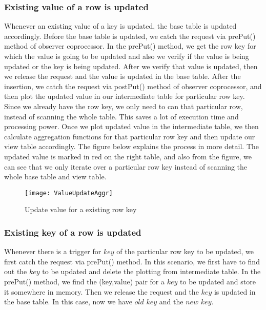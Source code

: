 \documentclass[11pt,a4paper,bibtotoc,idxtotoc,headsepline,footsepline,footexclude,BCOR12mm,DIV13]{scrbook}
\begin{document}
\subsubsection{Existing value of a row is updated}
Whenever an existing value of a key is updated, the base table is updated accordingly. Before the base table is updated, we catch the request via prePut() method of observer coprocessor. In the prePut() method, we get the row key for which the value is going to be updated and also we verify if the value is being updated or the key is being updated. After we verify that value is updated, then we release the request and the value is updated in the base table. After the insertion, we catch the request via postPut() method of observer coprocessor, and then plot the updated value in our intermediate table for particular row key. Since we already have  the row key, we only need to can that particular row, instead of scanning the whole table. This saves a lot of execution time and processing power. Once we plot updated value in the intermediate table, we then calculate aggregation functions for that particular row key and then update our view table accordingly.
The figure below explains the process in more detail. The updated value is marked in red on the right table, and also from the figure, we can see that we only iterate over a particular row key instead of scanning the whole base table and view table.

\begin{figure}
    \centering
    \texttt{[image: ValueUpdateAggr]}
    \caption{Update value for a existing row key}
    \label{sec:updatevalueforexistingkey}
    
\end{figure}  

\newpage
\subsubsection{Existing key of a row is updated}
\label{subsubsec:keyupdate}
Whenever there is a trigger for $key$ of the particular row key to be updated, we first catch the request via prePut() method. In this scenario, we first have to find out the $key$ to be updated and delete the plotting from intermediate table. In the prePut() method, we find the (key,value) pair for a $key$ to be updated and store it somewhere in memory. Then we release the request and the $key$ is updated in the base table. In this case, now we have $old$ $key$ and the $new$ $key$. 
\end{document}
